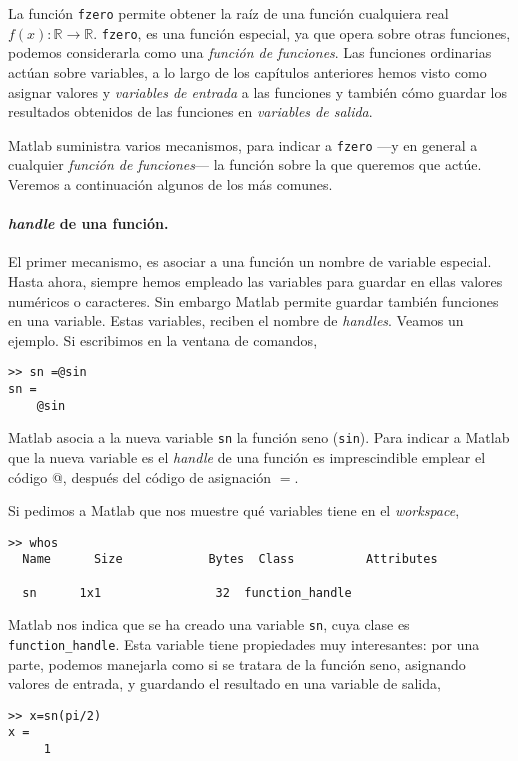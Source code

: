 La función \texttt{fzero} permite obtener la raíz de una función cualquiera real $f(x):\mathbb{R} \rightarrow \mathbb{R}$. \texttt{fzero}, es una función especial, ya que opera sobre otras funciones, podemos considerarla como una \emph{función de funciones}. Las funciones ordinarias actúan sobre variables, a lo largo de los capítulos anteriores hemos visto como asignar valores y \emph{variables de entrada} a las funciones y también cómo guardar los resultados obtenidos de las funciones en \emph{variables de salida}.

Matlab suministra varios mecanismos, para indicar a \texttt{fzero} ---y en general a cualquier \emph{función de funciones}--- la función sobre la que queremos que actúe. Veremos a continuación algunos de los más comunes.

\paragraph{\emph{handle} de una función.} El primer mecanismo, es asociar a una función un nombre de variable especial. Hasta ahora, siempre hemos empleado las variables para guardar en ellas valores numéricos o caracteres. Sin embargo Matlab permite guardar también funciones en una variable. Estas variables, reciben el nombre de \emph{handles}. Veamos un ejemplo. Si escribimos en la ventana de comandos, 

\begin{verbatim}
>> sn =@sin
sn = 
    @sin
\end{verbatim}

Matlab asocia a la nueva variable \texttt{sn} la función seno (\texttt{sin}). Para indicar a Matlab que la nueva variable es el \emph{handle} de una función es imprescindible emplear el código @, después del código de asignación $=$.

Si pedimos a Matlab que nos muestre qué variables tiene en el \emph{workspace},

\begin{verbatim}
>> whos
  Name      Size            Bytes  Class          Attributes

  sn      1x1                32  function_handle              

\end{verbatim}

Matlab nos indica que se ha creado una variable \texttt{sn}, cuya clase es \texttt{function\_handle}. Esta variable tiene propiedades muy interesantes: por una parte, podemos manejarla como si se tratara de la función seno, asignando valores de entrada, y guardando el resultado en una variable de salida, 
\begin{verbatim}
>> x=sn(pi/2)
x =
     1
\end{verbatim}

